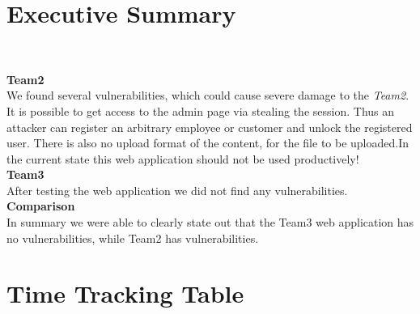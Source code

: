 \documentclass[headsepline,footsepline,footinclude=false,oneside,fontsize=11pt,paper=a4,listof=totoc,bibliography=totoc]{scrbook} %
\begin{document}


\frontmatter{}


{
	\chapter{Executive Summary}\

   \textbf{Team2}\\

	We found several vulnerabilities, which could cause severe damage to the \textit{Team2}. It is possible to get access to the admin page via stealing the session. Thus an attacker can register an arbitrary employee or customer and unlock the registered user. There is also no upload format of the content, for the file to be uploaded.In the	current state this web application should not be used productively!\\


	\textbf{Team3}\\

	After testing the web application we did not find any vulnerabilities.\\

	\textbf{Comparison}\\

	In summary we were able to clearly state out that the Team3 web application has no vulnerabilities, while Team2 has vulnerabilities.
}

\pagebreak
%
%
%
%
\tableofcontents{}
\mainmatter{}

\chapter{Time Tracking Table}
\end{document}
